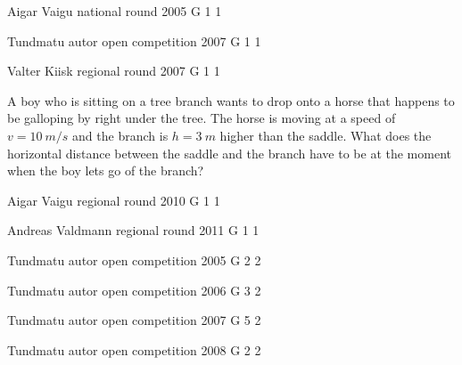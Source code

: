 \documentclass[11pt]{article}
\begin{document}
\graphicspath{{../problems/}}

\ylDisplay{} %
{Aigar Vaigu} %
{national round} %
{2005} %
{G 1} %
{1} %
{

\ifEngStatement
\fi
}

\ylDisplay{} %
{Tundmatu autor} %
{open competition} %
{2007} %
{G 1} %
{1} %
{

\ifEngStatement
\fi
}

{Valter Kiisk} %
{regional round} %
{2007} %
{G 1} %
{1} %
{

\ifEngStatement
A boy who is sitting on a tree branch wants to drop onto a horse that happens to be galloping by right under the tree. The horse is moving at a speed of $v = \SI{10}{m/s}$ and the branch is $h = \SI{3}{m}$ higher than the saddle. What does the horizontal distance between the saddle and the branch have to be at the moment when the boy lets go of the branch?
\fi
}

\ylDisplay{} %
{Aigar Vaigu} %
{regional round} %
{2010} %
{G 1} %
{1} %
{

\ifEngStatement
\fi
}

\ylDisplay{} %
{Andreas Valdmann} %
{regional round} %
{2011} %
{G 1} %
{1} %
{

\ifEngStatement
\fi
}

\ylDisplay{} %
{Tundmatu autor} %
{open competition} %
{2005} %
{G 2} %
{2} %
{

\ifEngStatement
\fi
}

\ylDisplay{} %
{Tundmatu autor} %
{open competition} %
{2006} %
{G 3} %
{2} %
{

\ifEngStatement
\fi
}

\ylDisplay{} %
{Tundmatu autor} %
{open competition} %
{2007} %
{G 5} %
{2} %
{

\ifEngStatement
\fi
}

\ylDisplay{} %
{Tundmatu autor} %
{open competition} %
{2008} %
{G 2} %
{2} %
{

\ifEngStatement
\fi
}
\end{document}
